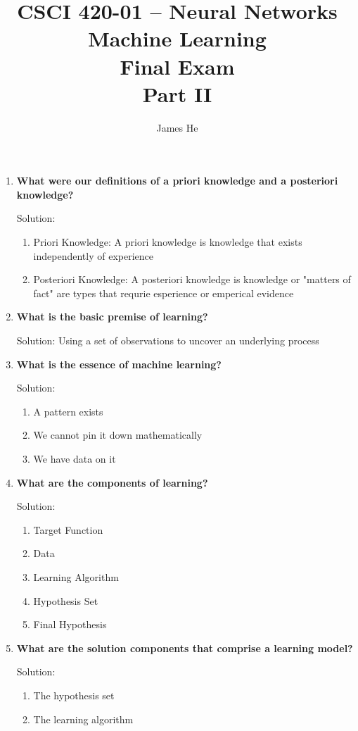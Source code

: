 \documentclass[10pt]{article} %
\title{CSCI 420-01 -- Neural Networks Machine Learning\\
Final Exam\\
{\large{\bf Part II}}}
\date{}
\author{James He}
\begin{document}
\maketitle

\begin{enumerate}
\item \textbf{What were our definitions of a priori knowledge and a posteriori knowledge?}

Solution:
\begin{enumerate}
    \item Priori Knowledge: A priori knowledge is knowledge that exists independently of experience
    \item Posteriori Knowledge: A posteriori knowledge is knowledge or "matters of fact" are types that requrie esperience or emperical evidence
\end{enumerate}
\bigskip


\item \textbf{What is the basic premise of learning?}

Solution: Using a  set of observations to uncover an underlying process
\bigskip


\item \textbf{What is the essence of machine learning?}

Solution:
\begin{enumerate}
    \item A pattern exists
    \item We cannot pin it down mathematically
    \item We have data on it
\end{enumerate}
\bigskip


\item \textbf{What are the components of learning?}

Solution:
\begin{enumerate}
    \item Target Function
    \item Data
    \item Learning Algorithm
    \item Hypothesis Set
    \item Final Hypothesis
\end{enumerate}
\bigskip


\item \textbf{What are the solution components that comprise a learning model?}

Solution:
\begin{enumerate}
    \item The hypothesis set
    \item The learning algorithm
\end{enumerate}
\bigskip



\end{enumerate}
\end{document}
